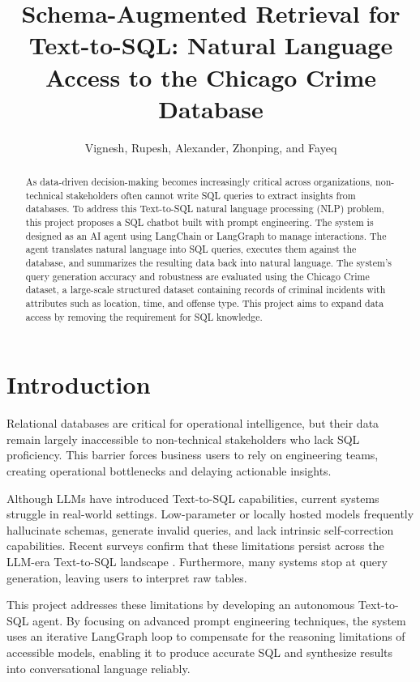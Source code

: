 \documentclass{article}
\title{Schema-Augmented Retrieval for Text-to-SQL: Natural Language Access to the Chicago Crime Database}
\author{Vignesh, Rupesh, Alexander, Zhonping, and Fayeq}
\date{}
\begin{document}
\maketitle

\begin{abstract}
As data-driven decision-making becomes increasingly critical across organizations, non-technical stakeholders often cannot write SQL queries to extract insights from databases. To address this Text-to-SQL natural language processing (NLP) problem, this project proposes a SQL chatbot built with prompt engineering. The system is designed as an AI agent using LangChain or LangGraph to manage interactions. The agent translates natural language into SQL queries, executes them against the database, and summarizes the resulting data back into natural language. The system's query generation accuracy and robustness are evaluated using the Chicago Crime dataset, a large-scale structured dataset containing records of criminal incidents with attributes such as location, time, and offense type. This project aims to expand data access by removing the requirement for SQL knowledge.
\end{abstract}

\section{Introduction}

Relational databases are critical for operational intelligence, but their data remain largely inaccessible to non-technical stakeholders who lack SQL proficiency. This barrier forces business users to rely on engineering teams, creating operational bottlenecks and delaying actionable insights.

Although LLMs have introduced Text-to-SQL capabilities, current systems struggle in real-world settings. Low-parameter or locally hosted models frequently hallucinate schemas, generate invalid queries, and lack intrinsic self-correction capabilities. Recent surveys confirm that these limitations persist across the LLM-era Text-to-SQL landscape \cite{qin2022survey, liu2024survey, shi2024survey}. Furthermore, many systems stop at query generation, leaving users to interpret raw tables.

This project addresses these limitations by developing an autonomous Text-to-SQL agent. By focusing on advanced prompt engineering techniques, the system uses an iterative LangGraph loop to compensate for the reasoning limitations of accessible models, enabling it to produce accurate SQL and synthesize results into conversational language reliably.
\end{document}
